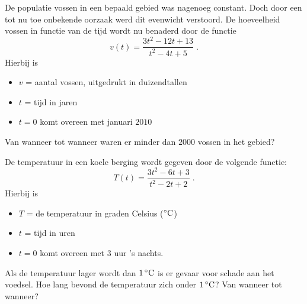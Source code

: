 \documentclass[12pt,twoside,a4paper]{article}
\begin{document}
\begin{oefening}
De populatie vossen in een bepaald gebied was nagenoeg constant. Doch door een tot nu toe onbekende oorzaak werd dit evenwicht verstoord. De hoeveelheid vossen in functie van de tijd wordt nu benaderd door de functie
$$v(t)=\dfrac{3t^2-12t+13}{t^2-4t+5}\;.$$
Hierbij is
\begin{itemize}
  \item $v$ = aantal vossen, uitgedrukt in duizendtallen
  \item $t$ = tijd in jaren
  \item $t = 0$ komt overeen met januari $2010$
\end{itemize}
Van wanneer tot wanneer waren er minder dan $2000$ vossen in het gebied?
\end{oefening}

\begin{oefening}
De temperatuur in een koele berging wordt gegeven door de volgende functie:
$$T(t)=\dfrac{3t^2-6t+3}{t^2-2t+2}\;.$$
Hierbij is
\begin{itemize}
  \item $T$ = de temperatuur in graden Celsius ($\grC$)
  \item $t$ = tijd in uren
  \item $t = 0$ komt overeen met 3 uur 's nachts.
\end{itemize}
Als de temperatuur lager wordt dan $1 \grC$ is er gevaar voor schade aan het voedsel. Hoe lang bevond de temperatuur zich onder $1 \grC$? Van wanneer tot wanneer?
\end{oefening}
\end{document}
